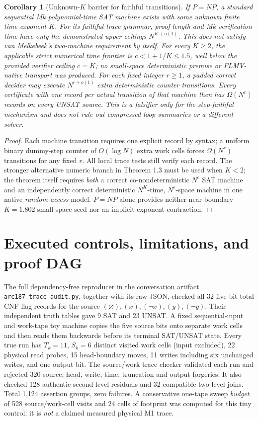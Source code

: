 \documentclass[11pt]{article}
\newtheorem{corollary}[theorem]{Corollary}
\begin{document}
\begin{corollary}[Unknown-$K$ barrier for faithful transitions]\label{cor:k}
If $P=NP$, a \emph{standard sequential Mk} polynomial-time SAT
machine exists with some unknown finite time exponent $K$.
For its faithful trace grammar, proof length and Mk verification
time have only the demonstrated \emph{upper ceilings}
$N^{K+o(1)}$. This does not satisfy van Melkebeek's two-machine
requirement by itself. For every $K\ge2$, the applicable strict
numerical time frontier is $c<1+1/K\le1.5$, well below the
provided verifier ceiling $c=K$; no small-space deterministic
premise or FLMV-native transport was produced.
For each fixed integer $r\ge1$, a padded correct decider may
execute $N^{r+o(1)}$ extra deterministic counter transitions.
Every certificate with \emph{one record per actual transition} of
that machine then has $\Omega(N^r)$ records on every UNSAT source.
This is a falsifier only for the step-faithful mechanism and
does not rule out compressed loop summaries or a different solver.
\end{corollary}
\begin{proof}
Each machine transition requires one explicit record by syntax;
a uniform binary dummy-step counter of $O(\log N)$ extra work
cells forces $\Omega(N^r)$ transitions for any fixed $r$.
All local trace tests still verify each record. The stronger
alternative numeric branch in Theorem 1.3 must be used when $K<2$;
the theorem itself requires \emph{both} a correct co-nondeterministic
$N^c$ SAT machine and an independently correct deterministic
$N^K$-time, $N^e$-space machine in one native \emph{random-access}
model. $P=NP$ alone provides neither near-boundary $K=1.802$
small-space seed nor an implicit exponent contraction.
\end{proof}

\section{Executed controls, limitations, and proof DAG}
The full dependency-free reproducer in the conversation artifact
\texttt{arc187\_trace\_audit.py}, together with its raw JSON, checked
all 32 five-bit total CNF flag records for the source
$(\varnothing),(x),(\neg x),(y),(\neg y)$.
Their independent truth tables gave 9 SAT and 23 UNSAT.
A fixed sequential-input and work-tape toy machine copies the five
source bits onto separate work cells and then reads them backwards
before its terminal SAT/UNSAT state. Every true run has $T_k=11$,
$S_k=6$ distinct visited work cells (input excluded), 22 physical
read probes, 15 head-boundary moves, 11 writes including six
unchanged writes, and one output bit. The source/work trace
checker validated each run and rejected 320 source, head, write,
time, truncation and output forgeries. It also checked
128 authentic second-level residuals and 32 compatible two-level
joins. Total 1,124 assertion groups, zero failures. A conservative
one-tape sweep \emph{budget} of 528 source/work-cell visits and
24 cells of footprint was computed for this tiny control; it is
\emph{not} a claimed measured physical M1 trace.
\end{document}
